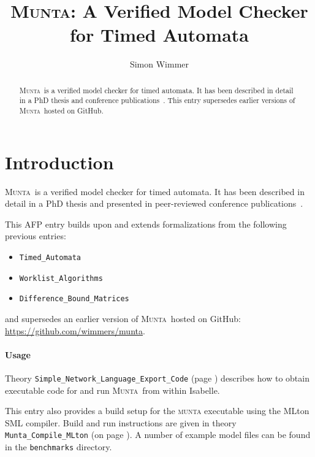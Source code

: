 \documentclass[10pt,a4paper]{article}
\newcommand{\munta}{\textsc{Munta}}
\begin{document}
\title{\munta: A Verified Model Checker for Timed Automata}
\author{Simon Wimmer}
\date{}

\maketitle
\begin{abstract}
  \munta\ is a verified model checker for timed automata.
  It has been described in detail in a PhD thesis \cite{wimmer-phd}
  and conference publications~\cite{munta-tacas,munta-tool-paper}.
  This entry supersedes earlier versions of \munta\ hosted on GitHub.
\end{abstract}

\setcounter{tocdepth}{2}
\tableofcontents
\newpage

\section*{Introduction}

\munta\ is a verified model checker for timed automata.
It has been described in detail in a PhD thesis \cite{wimmer-phd}
and presented in peer-reviewed conference publications~\cite{munta-tacas,munta-tool-paper}.

This AFP entry builds upon and extends formalizations from the following previous entries:
\begin{itemize}
  \item \texttt{Timed\_Automata}~\cite{timed-automata-afp}
  \item \texttt{Worklist\_Algorithms}~\cite{worklist-afp}
  \item \texttt{Difference\_Bound\_Matrices}~\cite{dbm-afp}
\end{itemize}
and supersedes an earlier version of \munta\ hosted on GitHub:
\url{https://github.com/wimmers/munta}.

\paragraph{Usage}
Theory \texttt{Simple\_Network\_Language\_Export\_Code} (page \pageref{export-munta}) describes
how to obtain executable code for and run \munta\ from within Isabelle.

This entry also provides a build setup for the \textsc{munta} executable
using the MLton SML compiler.
Build and run instructions are given in theory \texttt{Munta\_Compile\_MLton}
(on page \pageref{build-mlton}).
A number of example model files can be found in the \texttt{benchmarks} directory.
\end{document}
